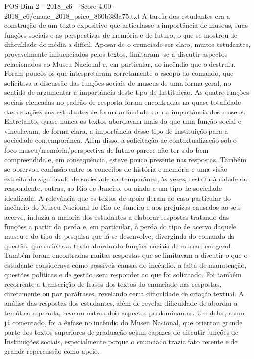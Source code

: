 \begin{textsample}{POS Dim 2 – 2018\_c6 – Score 4.00 – 2018\_c6/enade\_2018\_psico\_860b383a75.txt}
A tarefa dos estudantes era a construção de um texto expositivo que articulasse a importância de museus, suas funções sociais e as perspectivas de memória e de futuro, o que se mostrou de dificuldade de média a difícil.
Apesar de o enunciado ser claro, muitos estudantes, provavelmente influenciados pelos textos, limitaram -se a discutir aspectos relacionados ao Museu Nacional e, em particular, ao incêndio que o destruiu.
Foram poucos os que interpretaram corretamente o escopo do comando, que solicitava a discussão das funções sociais de museus de uma forma geral, no sentido de argumentar a importância deste tipo de Instituição.
As quatro funções sociais elencadas no padrão de resposta foram encontradas na quase totalidade das redações dos estudantes de forma articulada com a importância dos museus.
Entretanto, quase nunca os textos abordavam mais do que uma função social e vinculavam, de forma clara, a importância desse tipo de Instituição para a sociedade contemporânea.
Além disso, a solicitação de contextualização sob o foco museu/memória/perspectiva de futuro parece não ter sido bem compreendida e, em consequência, esteve pouco presente nas respostas.
Também se observou confusão entre os conceitos de história e memória e uma visão estreita do significado de sociedade contemporânea, às vezes, restrita à cidade do respondente, outras, ao Rio de Janeiro, ou ainda a um tipo de sociedade idealizada.
A relevância que os textos de apoio deram ao caso particular do incêndio do Museu Nacional do Rio de Janeiro e aos prejuízos causados ao seu acervo, induziu a maioria dos estudantes a elaborar respostas tratando das funções a partir da perda e, em particular, à perda do tipo de acervo daquele museu e do tipo de pesquisa que lá se desenvolve, divergindo do comando da questão, que solicitava texto abordando funções sociais de museus em geral.
Também foram encontradas muitas respostas que se limitavam a discutir o que o estudante considerava como possíveis causas do incêndio, a falta de manutenção, questões políticas e de gestão, sem responder ao que foi solicitado.
Foi também recorrente a transcrição de frases dos textos do enunciado nas respostas, diretamente ou por paráfrases, revelando certa dificuldade de criação textual.
A análise das respostas dos estudantes, além de revelar dificuldade de abordar a temática esperada, revelou outros dois aspectos predominantes.
Um deles, como já comentado, foi a ênfase no incêndio do Museu Nacional, que orientou grande parte dos textos superiores de graduação sejam capazes de discutir funções de Instituições sociais, especialmente porque o enunciado trazia fato recente e de grande repercussão como apoio.

\end{textsample}
